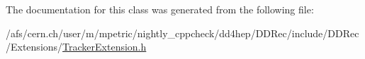 The documentation for this class was generated from the following file:\begin{DoxyCompactItemize}
\item 
/afs/cern.ch/user/m/mpetric/nightly\_\-cppcheck/dd4hep/DDRec/include/DDRec/Extensions/\hyperlink{_tracker_extension_8h}{TrackerExtension.h}\end{DoxyCompactItemize}
